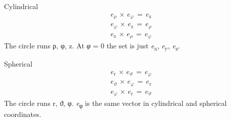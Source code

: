 \documentclass[11pt]{article}
\begin{document}
\begin{keepsection}
\begin{equationcard}{Cylindrical}
\[ \begin{gathered} {e}_{ρ}\, \times \, {e}_{φ}\, =\, {e}_{\mathrm{z}} \\ {e}_{φ}\, \times \, {e}_{\mathrm{z}}\, =\, {e}_{ρ} \\ {e}_{\mathrm{z}}\, \times \, {e}_{ρ}\, =\, {e}_{φ} \end{gathered} \]
{\small The circle runs ρ, φ, z. At \textit{φ} = 0 the set is just \textit{e}\textsubscript{x}, \textit{e}\textsubscript{y}, \textit{e}\textsubscript{z}.}
\end{equationcard}

\begin{equationcard}{Spherical}
\[ \begin{gathered} {e}_{\mathrm{r}}\, \times \, {e}_{ϑ}\, =\, {e}_{φ} \\ {e}_{ϑ}\, \times \, {e}_{φ}\, =\, {e}_{\mathrm{r}} \\ {e}_{φ}\, \times \, {e}_{\mathrm{r}}\, =\, {e}_{ϑ} \end{gathered} \]
{\small The circle runs r, ϑ, φ. \textit{e}\textsubscript{φ} is the same vector in cylindrical and spherical coordinates.}
\end{equationcard}
\end{keepsection}
\end{document}
